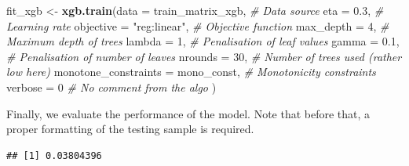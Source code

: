 \documentclass[]{krantz}
\makeatletter
\newenvironment{Shaded}{\begin{snugshade}}{\end{snugshade}}
\newcommand{\CommentTok}[1]{\textcolor[rgb]{0.37,0.37,0.37}{\textit{#1}}}
\newcommand{\DataTypeTok}[1]{\textcolor[rgb]{0.27,0.27,0.27}{#1}}
\newcommand{\DecValTok}[1]{\textcolor[rgb]{0.06,0.06,0.06}{#1}}
\newcommand{\FloatTok}[1]{\textcolor[rgb]{0.06,0.06,0.06}{#1}}
\newcommand{\KeywordTok}[1]{\textcolor[rgb]{0.27,0.27,0.27}{\textbf{#1}}}
\newcommand{\NormalTok}[1]{#1}
\newcommand{\OperatorTok}[1]{\textcolor[rgb]{0.43,0.43,0.43}{\textbf{#1}}}
\newcommand{\StringTok}[1]{\textcolor[rgb]{0.5,0.5,0.5}{#1}}
\newenvironment{kframe}{%
\medskip{}
\setlength{\fboxsep}{.8em}
 \def\at@end@of@kframe{}%
 \ifinner\ifhmode%
  \def\at@end@of@kframe{\end{minipage}}%
  \begin{minipage}{\columnwidth}%
 \fi\fi%
 \def\FrameCommand##1{\hskip\@totalleftmargin \hskip-\fboxsep
 \colorbox{shadecolor}{##1}\hskip-\fboxsep
     \hskip-\linewidth \hskip-\@totalleftmargin \hskip\columnwidth}%
 \MakeFramed {\advance\hsize-\width
   \@totalleftmargin\z@ \linewidth\hsize
   \@setminipage}}%
 {\par\unskip\endMakeFramed%
 \at@end@of@kframe}
\renewenvironment{Shaded}{\begin{kframe}}{\end{kframe}}
\theoremstyle{definition}
\theoremstyle{definition}
\theoremstyle{definition}
\theoremstyle{remark}
\makeatother
\begin{document}
\begin{Shaded}
\begin{Highlighting}[]
\NormalTok{fit_xgb <-}\StringTok{ }\KeywordTok{xgb.train}\NormalTok{(}\DataTypeTok{data =}\NormalTok{ train_matrix_xgb,     }\CommentTok{# Data source }
              \DataTypeTok{eta =} \FloatTok{0.3}\NormalTok{,                          }\CommentTok{# Learning rate}
              \DataTypeTok{objective =} \StringTok{"reg:linear"}\NormalTok{,           }\CommentTok{# Objective function}
              \DataTypeTok{max_depth =} \DecValTok{4}\NormalTok{,                      }\CommentTok{# Maximum depth of trees}
              \DataTypeTok{lambda =} \DecValTok{1}\NormalTok{,                         }\CommentTok{# Penalisation of leaf values}
              \DataTypeTok{gamma =} \FloatTok{0.1}\NormalTok{,                        }\CommentTok{# Penalisation of number of leaves}
              \DataTypeTok{nrounds =} \DecValTok{30}\NormalTok{,                       }\CommentTok{# Number of trees used (rather low here)}
              \DataTypeTok{monotone_constraints =}\NormalTok{ mono_const,  }\CommentTok{# Monotonicity constraints}
              \DataTypeTok{verbose =} \DecValTok{0}                         \CommentTok{# No comment from the algo }
\NormalTok{    )}
\end{Highlighting}
\end{Shaded}

\normalsize

Finally, we evaluate the performance of the model. Note that before
that, a proper formatting of the testing sample is required.

\footnotesize

\begin{Shaded}
\end{Shaded}

\begin{verbatim}
## [1] 0.03804396
\end{verbatim}
\end{document}
